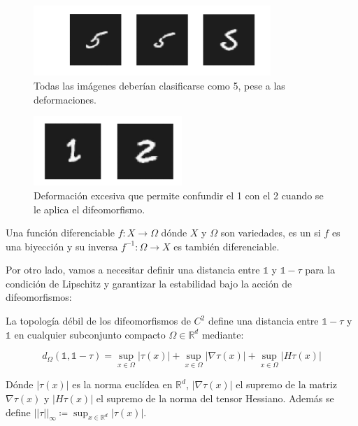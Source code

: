 \begin{figure}[!h]
    \centering
    \includegraphics[width=0.8\textwidth]{img/5_deformado.png}
    \caption{Todas las imágenes deberían clasificarse como 5, pese a las deformaciones.}
    \label{fig:deformaciones_5}
\end{figure}

\begin{figure}[!h]
    \centering
    \includegraphics[width=0.5\textwidth]{img/1_excesivamente_deformado.png}
    \caption{Deformación excesiva que permite confundir el 1 con el 2 cuando se le aplica el difeomorfismo.}
    \label{fig:deformaciones_1}
\end{figure}

\begin{definicion}
    Una función diferenciable $f: X \rightarrow \Omega$ dónde $X$ y $\Omega$ son variedades, es un  si $f$ es una biyección y su inversa $f^{-1}:\Omega \rightarrow X$ es también diferenciable. 
\end{definicion}

\noindent Por otro lado, vamos a necesitar definir una distancia entre $\mathbb{1}$ y $\mathbb{1}-\tau$ para la condición de Lipschitz y garantizar la estabilidad bajo la acción de difeomorfismos:

\begin{definicion}
    La topología débil de los difeomorfismos de $C^2$ define una distancia entre $\mathbb{1}-\tau$ y $\mathbb{1}$ en cualquier subconjunto compacto $\Omega \in  \mathbb{R}^d$ mediante: 
    
    $$d_\Omega(\mathbb{1},\mathbb{1}-\tau) = \sup_{x \in \Omega} |\tau (x)| + \sup_{x \in \Omega} |\nabla \tau (x)| + \sup_{x \in \Omega}|H \tau (x)|$$
\end{definicion}

\noindent Dónde $|\tau(x)|$ es la norma euclídea en $\mathbb{R}^d$, $|\nabla \tau (x)|$ el supremo de la matriz $\nabla \tau (x)$ y $|H \tau (x)|$ el supremo de la norma del tensor Hessiano. Además se define $||\tau||_{\infty}\coloneqq \sup_{x\in\mathbb{R}^d} |\tau(x)|$.

